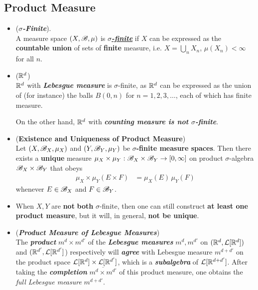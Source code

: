 \documentclass[11pt]{article}
\begin{document}
\subsection{Product Measure}
\begin{itemize}
\item \begin{definition} (\textbf{\emph{$\sigma$-Finite}}).\\
A measure space $(X, {\mathscr B}, \mu)$ is \underline{\textbf{\emph{$\sigma$-finite}}} if $X$ can be expressed as the \textbf{countable union} of sets of \textbf{finite} measure, i.e. $X = \bigcup_{n}X_n$, $\mu(X_n) < \infty$ for all $n$.
\end{definition}

\item \begin{example} (${\mathbb R}^d$)\\
${\mathbb R}^d$ with \textbf{\emph{Lebesgue measure}} is $\sigma$-finite, as ${\mathbb R}^d$ can be expressed as the union of (for instance) the balls $B(0, n)$ for
$n = 1, 2, 3, \ldots$, each of which has finite measure. 

On the other hand, ${\mathbb R}^d$ with \textbf{\emph{counting measure is not $\sigma$-finite}}.
\end{example}

\item \begin{proposition}  (\textbf{Existence and Uniqueness of Product Measure}) \citep{tao2011introduction}\\
Let $(X, {\mathscr B}_X, \mu_X)$ and $(Y, {\mathscr B}_Y, \mu_Y)$ be \textbf{$\sigma$-finite measure spaces}. Then there exists a \textbf{unique} measure $\mu_X \times \mu_Y: {\mathscr B}_X \times {\mathscr B}_Y \to [0, \infty]$ on product $\sigma$-algebra ${\mathscr B}_X \times {\mathscr B}_Y$ that obeys 
\begin{align*}
\mu_X \times \mu_Y(E \times F) &= \mu_X(E)\,\mu_Y(F)
\end{align*} whenever $E \in {\mathscr B}_X$ and $F \in {\mathscr B}_Y$.
\end{proposition}

\item \begin{remark}
When $X, Y$ are \textbf{not} \textbf{both} $\sigma$-finite, then one can still construct \textbf{at least one product measure}, but it will, in general, \textbf{not be unique}. 
\end{remark}

\item \begin{remark} (\emph{\textbf{Product Measure of Lebesgue Measures}})\\
The \textbf{\emph{product}} $m^d \times m^{d'}$ of the \textbf{\emph{Lebesgue measures}} $m^d, m^{d'}$ on $({\mathbb R}^d, {\mathcal L}[{\mathbb R}^d])$ and $({\mathbb R}^{d'}, {\mathcal L}[{\mathbb R}^{d'}]$) respectively will \textbf{\emph{agree}} with Lebesgue measure $m^{d+d'}$ on the product space ${\mathcal L}[{\mathbb R}^d] \times  {\mathcal L}[{\mathbb R}^{d'}]$, which is a \textbf{\emph{subalgebra}} of ${\mathcal L}[{\mathbb R}^{d+d'}]$. After taking the \emph{\textbf{completion}} $\overline{m^d \times m^{d'}}$ of this product measure, one obtains the \emph{full Lebesgue measure} $m^{d+d'}$.
\end{remark}


\end{itemize}
\end{document}
